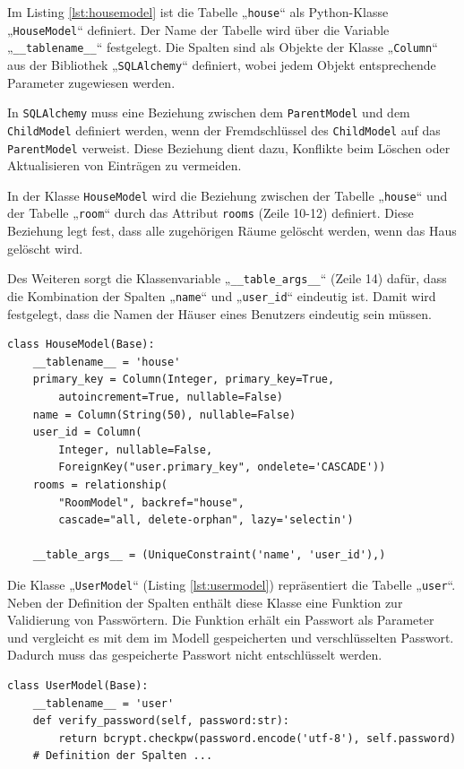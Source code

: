 \documentclass[12pt, letterpaper]{article}
\begin{document}
  \par Im Listing \ref{lst:housemodel} ist die Tabelle „\texttt{house}“ als Python-Klasse „\texttt{HouseModel}“ definiert. Der Name der Tabelle wird über die Variable „\texttt{\_\_tablename\_\_}“ festgelegt. Die Spalten sind als Objekte der Klasse „\texttt{Column}“ aus der Bibliothek „\texttt{SQLAlchemy}“ definiert, wobei jedem Objekt entsprechende Parameter zugewiesen werden.
  \par In \texttt{SQLAlchemy} muss eine Beziehung zwischen dem \texttt{ParentModel} und dem \texttt{ChildModel} definiert werden, wenn der Fremdschlüssel des \texttt{ChildModel} auf das \texttt{ParentModel} verweist. Diese Beziehung dient dazu, Konflikte beim Löschen oder Aktualisieren von Einträgen zu vermeiden.
  \par In der Klasse \texttt{HouseModel} wird die Beziehung zwischen der Tabelle „\texttt{house}“ und der Tabelle „\texttt{room}“ durch das Attribut \texttt{rooms} (Zeile 10-12) definiert. Diese Beziehung legt fest, dass alle zugehörigen Räume gelöscht werden, wenn das Haus gelöscht wird.
  \par Des Weiteren sorgt die Klassenvariable „\texttt{\_\_table\_args\_\_}“ (Zeile 14) dafür, dass die Kombination der Spalten „\texttt{name}“ und „\texttt{user\_id}“ eindeutig ist. Damit wird festgelegt, dass die Namen der Häuser eines Benutzers eindeutig sein müssen.
  \begin{lstlisting}[style=mypython, label={lst:housemodel}, caption={models.py: HouseModel}]
  class HouseModel(Base):
    __tablename__ = 'house'
    primary_key = Column(Integer, primary_key=True, 
        autoincrement=True, nullable=False)
    name = Column(String(50), nullable=False)
    user_id = Column(
        Integer, nullable=False, 
        ForeignKey("user.primary_key", ondelete='CASCADE'))
    rooms = relationship(
        "RoomModel", backref="house", 
        cascade="all, delete-orphan", lazy='selectin')

    __table_args__ = (UniqueConstraint('name', 'user_id'),)
  \end{lstlisting}
  \par Die Klasse „\texttt{UserModel}“ (Listing \ref{lst:usermodel}) repräsentiert die Tabelle „\texttt{user}“. Neben der Definition der Spalten enthält diese Klasse eine Funktion zur Validierung von Passwörtern. Die Funktion erhält ein Passwort als Parameter und vergleicht es mit dem im Modell gespeicherten und verschlüsselten Passwort. Dadurch muss das gespeicherte Passwort nicht entschlüsselt werden.
  \begin{lstlisting}[style=mypython, label={lst:usermodel},caption={models.py: UserModel}]
    class UserModel(Base):
    __tablename__ = 'user'
    def verify_password(self, password:str):
        return bcrypt.checkpw(password.encode('utf-8'), self.password) 
    # Definition der Spalten ...
  \end{lstlisting}
  
\end{document}
